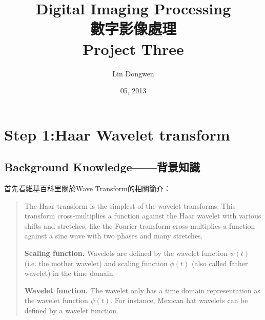 \documentclass[a4paper,12pt]{article}%
\title{Digital Imaging Processing\\ 數字影像處理 \\ Project Three  }
\author{\small Lin Dongwen}
\date{05, 2013}
\begin{document}
    \maketitle
    \newpage
%

\section{Step 1:Haar Wavelet transform}

\subsection{Background Knowledge——背景知識}

\noindent 首先看維基百科里關於Wave Transform的相關簡介：
\begin{quote}

The Haar transform is the simplest of the wavelet transforms. This transform cross-multiplies a function against the Haar wavelet with various shifts and stretches, like the Fourier transform cross-multiplies a function against a sine wave with two phases and many stretches.

\textbf{Scaling function.} Wavelets are defined by the wavelet function $\psi(t)$ (i.e. the mother wavelet) and scaling function $\phi(t)$ (also called father wavelet) in the time domain.

\textbf{Wavelet function.} The wavelet only has a time domain representation as the wavelet function $\psi(t)$.
For instance, Mexican hat wavelets can be defined by a wavelet function.
\end{quote}
\end{document}
